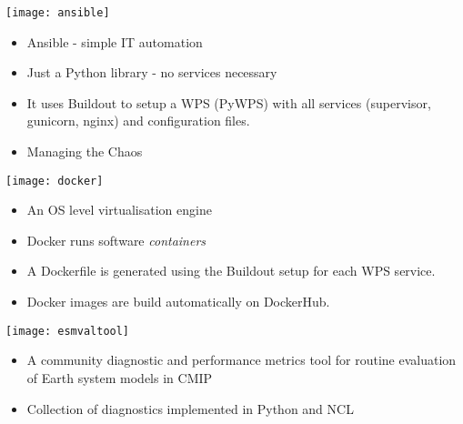\documentclass[portrait,a0paper,fontscale=0.4]{baposter} %
\newcommand{\compresslist}{%
\setlength{\itemsep}{1pt}%
\setlength{\parskip}{0pt}%
\setlength{\parsep}{0pt}%
}
\begin{document}
\begin{poster}
{\begin{multicols}{2}
\begin{minipage}{0.5\textwidth}
    \begin{minipage}{0.15\textwidth}
      \texttt{[image: ansible]}
    \end{minipage}
    \begin{minipage}{0.85\textwidth}
      \begin{itemize}\compresslist
        \item Ansible - simple IT automation
        \item Just a Python library - no services necessary
        \item It uses Buildout to setup a WPS (PyWPS) with all services (supervisor, gunicorn, nginx) and configuration files.
        \item Managing the Chaos
      \end{itemize}
    \end{minipage}

    \begin{minipage}{0.15\textwidth}
      \texttt{[image: docker]}
    \end{minipage}
    \begin{minipage}{0.85\textwidth}
      \begin{itemize}\compresslist
        \item An OS level virtualisation engine
        \item Docker runs software \textit{containers}
        \item A Dockerfile is generated using the Buildout setup for each WPS service.
        \item Docker images are build automatically on DockerHub.
      \end{itemize}
    \end{minipage}

    \begin{minipage}{0.15\textwidth}
      \texttt{[image: esmvaltool]}
    \end{minipage}
    \begin{minipage}{0.85\textwidth}
      \begin{itemize}\compresslist
        \item A community diagnostic and performance metrics tool for routine evaluation of Earth system models in CMIP
        \item Collection of diagnostics implemented in Python and NCL
      \end{itemize}
    \end{minipage}
  \end{minipage}
  \end{multicols}
}


\end{poster}
\end{document}
